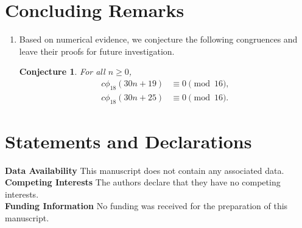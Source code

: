 \documentclass[12pt]{article}
\numberwithin{equation}{section}
\theoremstyle{plain}
\numberwithin{theorem}{section}
\newtheorem{conjecture}[theorem]{Conjecture}
\theoremstyle{definition}
\theoremstyle{remark}
\begin{document}
\section{Concluding Remarks}

    \begin{enumerate}
        \item Based on numerical evidence, we conjecture the following congruences and leave their proofs for future investigation.
    \begin{conjecture}For all $n\ge0$,
       \begin{align*}
        c\phi_{18}\left(30n+19\right)&\equiv 0\pmod{16},\\
			c\phi_{18}\left(30n+25\right)&\equiv 0\pmod{16}.
    \end{align*} 
    \end{conjecture}
    \end{enumerate}
    
\section*{Statements and Declarations}
    
    \textbf{Data Availability} This manuscript does not contain any associated data.\\
	\textbf{Competing Interests} The authors declare that they have no competing interests.\\
	\textbf{Funding Information} No funding was received for the preparation of this manuscript.
	
	
	
	
	
	
\end{document}
